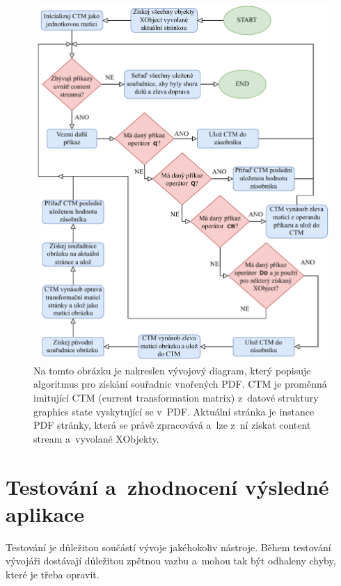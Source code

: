 \begin{figure}[H]
    \centering
    \includegraphics[width=\linewidth]{obrazky-figures/embedded_pdf_flow_chart.pdf}
    \caption{
        Na tomto obrázku je nakreslen vývojový diagram, který popisuje
        algoritmus pro získání souřadnic vnořených PDF. CTM je proměnná imitující 
        CTM (current transformation matrix) z~datové struktury graphics state
        vyskytující se v~PDF. Aktuální stránka je instance PDF stránky, která
        se právě zpracovává a~lze z~ní získat content stream a~vyvolané XObjekty. 
    }
    \label{pic_embedded_pdf_flow_chart}
\end{figure}






\chapter{Testování a~zhodnocení výsledné aplikace} \label{testing}
Testování je důležitou součástí vývoje jakéhokoliv nástroje. Během testování
vývojáři dostávají důležitou zpětnou vazbu a~mohou tak být odhaleny chyby,
které je třeba opravit.


